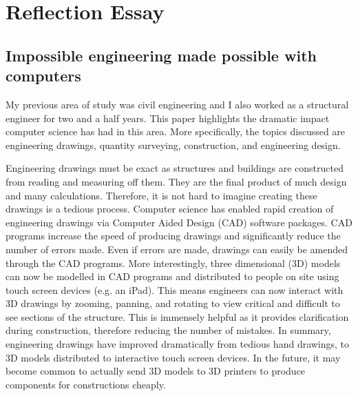 \documentclass[11pt]{article} %
\begin{document}

\section*{Reflection Essay}
\subsection*{Impossible engineering made possible with computers} %

My previous area of study was civil engineering and I also worked as a structural engineer for two and a half years. This paper highlights the dramatic impact computer science has had in this area.  More specifically, the topics discussed are engineering drawings, quantity surveying, construction, and engineering design.

Engineering drawings must be exact as structures and buildings are constructed from reading and measuring off them. They are the final product of much design and many calculations. Therefore, it is not hard to imagine creating these drawings is a tedious process. Computer science has enabled rapid creation of engineering drawings via Computer Aided Design (CAD) software packages\cite{CADsoft}. CAD programs increase the speed of producing drawings and significantly reduce the number of errors made. Even if errors are made, drawings can easily be amended through the CAD programs. More interestingly, three dimensional (3D) models can now be modelled in CAD programs and distributed to people on site using touch screen devices (e.g. an iPad). This means engineers can now interact with 3D drawings by zooming, panning, and rotating to view critical and difficult to see sections of the structure. This is immensely helpful as it provides clarification during construction, therefore reducing the number of mistakes. In summary, engineering drawings have improved dramatically from tedious hand drawings, to 3D models distributed to interactive touch screen devices. In the future, it may become common to actually send 3D models to 3D printers to produce components for constructions cheaply. 
\end{document}
